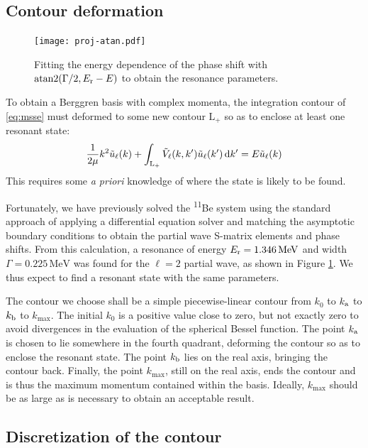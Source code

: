 \documentclass[amsmath, amssymb, aps, floatfix, nofootinbib, preprintnumbers,
  showpacs, superscriptaddress, twocolumn]{revtex4-1}
\begin{document}
\subsection{Contour deformation}

\begin{figure}
  \texttt{[image: proj-atan.pdf]}
  \caption{Fitting the energy dependence of the phase shift with
    $\operatorname{atan2}(\Gamma/2, E_{\text r} - E)$ to obtain the resonance
    parameters.}
  \label{fig:atan}
\end{figure}

To obtain a Berggren basis with complex momenta, the integration contour of
\eqref{eq:msse} must deformed to some new contour $\mathrm L_+$ so as to
enclose at least one resonant state:
\begin{align} \label{eq:dmsse}
  \frac{1}{2 \mu} k^2 \tilde u_\ell(k)
  + \int_{\mathrm L_+} \tilde V_\ell(k, k') \tilde u_\ell(k') \operatorname{d \!}\mathord{} k'
  = E \tilde u_\ell(k)
\end{align}
This requires some \textit{a priori} knowledge of where the state is likely to
be found.

Fortunately, we have previously solved the \textsuperscript{11}Be system using
the standard approach of applying a differential equation solver and matching
the asymptotic boundary conditions to obtain the partial wave S-matrix
elements and phase shifts.  From this calculation, a resonance of energy
$E_{\text r} = 1.346\,\mathrm{MeV}$ and width $\Gamma = 0.225\,\mathrm{MeV}$
was found for the $\ell = 2$ partial wave, as shown in Figure \ref{fig:atan}.
We thus expect to find a resonant state with the same parameters.

The contour we choose shall be a simple piecewise-linear contour from $k_0$ to
$k_{\text a}$ to $k_{\text b}$ to $k_{\text{max}}$.  The initial $k_0$ is a
positive value close to zero, but not exactly zero to avoid divergences in the
evaluation of the spherical Bessel function.  The point $k_{\text a}$ is
chosen to lie somewhere in the fourth quadrant, deforming the contour so as to
enclose the resonant state.  The point $k_{\text b}$ lies on the real axis,
bringing the contour back.  Finally, the point $k_{\text{max}}$, still on the
real axis, ends the contour and is thus the maximum momentum contained within
the basis.  Ideally, $k_{\text{max}}$ should be as large as is necessary to
obtain an acceptable result.

\subsection{Discretization of the contour}
\end{document}
